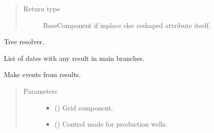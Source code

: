 \documentclass[letterpaper,10pt,english]{sphinxmanual}
\begin{document}
\begin{fulllineitems}
\begin{fulllineitems}
\begin{quote}
\begin{description}
\item[{Return type}] \leavevmode
BaseComponent if inplace else reshaped attribute itself.

\end{description}\end{quote}

\end{fulllineitems}


\begin{fulllineitems}
\label{\detokenize{api/wells:geology.src.wells.Wells.resolver}}
Tree resolver.

\end{fulllineitems}


\begin{fulllineitems}
\label{\detokenize{api/wells:geology.src.wells.Wells.result_dates}}
List of dates with any result in main branches.

\end{fulllineitems}


\begin{fulllineitems}
\label{\detokenize{api/wells:geology.src.wells.Wells.results_to_events}}
Make events from results.
\begin{quote}\begin{description}
\item[{Parameters}] \leavevmode\begin{itemize}
\item {} 
 ({\hyperref[\detokenize{api/grids:geology.src.Grid}]{}}) \textendash{} Grid component.

\item {} 
 (\sphinxstyleliteralemphasis{\sphinxupquote{, }}) \textendash{} Control mode for production wells.


\end{itemize}
\end{description}
\end{quote}
\end{fulllineitems}
\end{fulllineitems}
\end{document}
